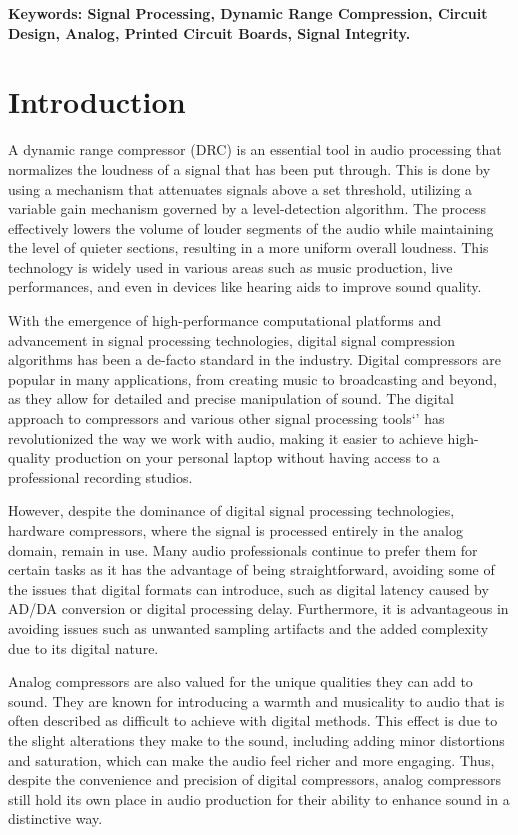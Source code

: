 \documentclass[10pt]{article}
\begin{document}
    \begin{multicols*}{2}

        \textbf{
            Keywords: 
            Signal Processing, Dynamic Range Compression, Circuit Design, Analog, Printed Circuit Boards, Signal Integrity.
        }

        \section{Introduction}
            A dynamic range compressor (DRC) is an essential tool in audio processing that normalizes the loudness of a signal that has been put through. This is done by using a mechanism that attenuates signals above a set threshold, utilizing a variable gain mechanism governed by a level-detection algorithm. The process effectively lowers the volume of louder segments of the audio while maintaining the level of quieter sections, resulting in a more uniform overall loudness. This technology is widely used in various areas such as music production, live performances, and even in devices like hearing aids to improve sound quality.\par
            With the emergence of high-performance computational platforms and advancement in signal processing technologies, digital signal compression algorithms has been a de-facto standard in the industry. Digital compressors are popular in many applications, from creating music to broadcasting and beyond, as they allow for detailed and precise manipulation of sound. The digital approach to compressors and various other signal processing tools`' has revolutionized the way we work with audio, making it easier to achieve high-quality production on your personal laptop without having access to a professional recording studios.\par
            However, despite the dominance of digital signal processing technologies, hardware compressors, where the signal is processed entirely in the analog domain, remain in use. Many audio professionals continue to prefer them for certain tasks as it has the advantage of being straightforward, avoiding some of the issues that digital formats can introduce, such as digital latency caused by AD/DA conversion or digital processing delay. Furthermore, it is advantageous in avoiding issues such as unwanted sampling artifacts and the added complexity due to its digital nature.\par
            Analog compressors are also valued for the unique qualities they can add to sound. They are known for introducing a warmth and musicality to audio that is often described as difficult to achieve with digital methods. This effect is due to the slight alterations they make to the sound, including adding minor distortions and saturation, which can make the audio feel richer and more engaging. Thus, despite the convenience and precision of digital compressors, analog compressors still hold its own place in audio production for their ability to enhance sound in a distinctive way.\par

\end{multicols*}
\end{document}
